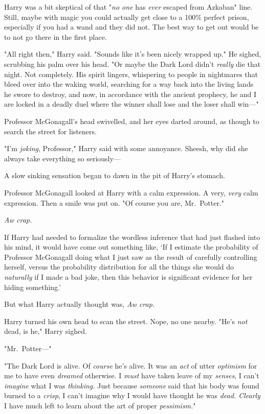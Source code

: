 Harry was a bit skeptical of that "\emph{no one} has \emph{ever} escaped from
Azkaban" line. Still, maybe with magic you could actually get close to a 100\%
perfect prison, especially if you had a wand and they did not. The best way to
get out would be to not go there in the first place.

"All right then," Harry said. "Sounds like it's been nicely wrapped up." He
sighed, scrubbing his palm over his head. "Or maybe the Dark Lord didn't
\emph{really} die that night. Not completely. His spirit lingers, whispering to
people in nightmares that bleed over into the waking world, searching for a way
back into the living lands he swore to destroy, and now, in accordance with the
ancient prophecy, he and I are locked in a deadly duel where the winner shall
lose and the loser shall win—"

Professor McGonagall's head swivelled, and her eyes darted around, as though to
search the street for listeners.

"I'm \emph{joking}, Professor," Harry said with some annoyance. Sheesh, why did
she always take everything so seriously—

A slow sinking sensation began to dawn in the pit of Harry's stomach.

Professor McGonagall looked at Harry with a calm expression. A very,
\emph{very} calm expression. Then a smile was put on. "Of course you are,
Mr.~Potter."

\emph{Aw crap.}

If Harry had needed to formalize the wordless inference that had just flashed
into his mind, it would have come out something like, `If I estimate the
probability of Professor McGonagall doing what I just saw as the result of
carefully controlling herself, versus the probability distribution for all the
things she would do \emph{naturally} if I made a bad joke, then this behavior
is significant evidence for her hiding something.'

But what Harry actually thought was, \emph{Aw crap.}

Harry turned his own head to scan the street. Nope, no one nearby. "He's
\emph{not} dead, is he," Harry sighed.

"Mr.~Potter—"

"The Dark Lord is alive. Of \emph{course} he's alive. It was an \emph{act} of
utter \emph{optimism} for me to have even \emph{dreamed} otherwise. I
\emph{must} have taken leave of my \emph{senses}, I can't \emph{imagine} what I
was \emph{thinking.} Just because \emph{someone} said that his body was found
burned to a \emph{crisp}, I can't imagine why I would have thought he was
\emph{dead. Clearly} I have much left to learn about the art of proper
\emph{pessimism.}"

